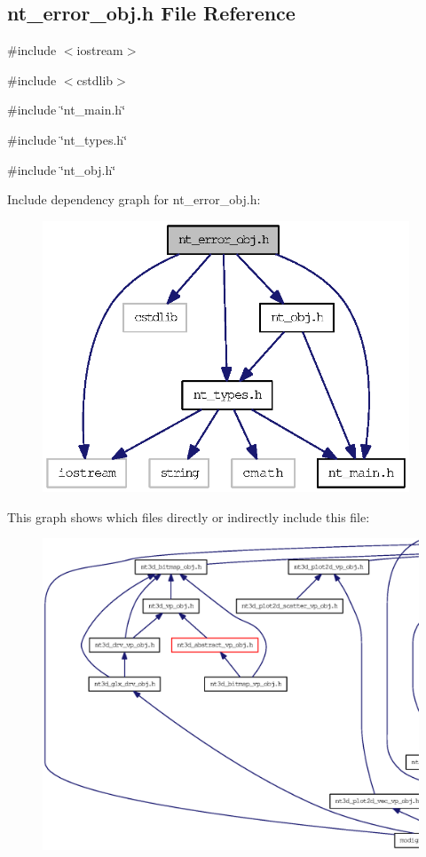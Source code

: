 \subsection{nt\_\-error\_\-obj.h File Reference}
\label{nt__error__obj_8h}
{\ttfamily \#include $<$iostream$>$}\par
{\ttfamily \#include $<$cstdlib$>$}\par
{\ttfamily \#include \char`\"{}nt\_\-main.h\char`\"{}}\par
{\ttfamily \#include \char`\"{}nt\_\-types.h\char`\"{}}\par
{\ttfamily \#include \char`\"{}nt\_\-obj.h\char`\"{}}\par
Include dependency graph for nt\_\-error\_\-obj.h:
\nopagebreak
\begin{figure}[H]
\begin{center}
\leavevmode
\includegraphics[width=310pt]{nt__error__obj_8h__incl}
\end{center}
\end{figure}
This graph shows which files directly or indirectly include this file:
\nopagebreak
\begin{figure}[H]
\begin{center}
\leavevmode
\includegraphics[width=400pt]{nt__error__obj_8h__dep__incl}
\end{center}
\end{figure}
